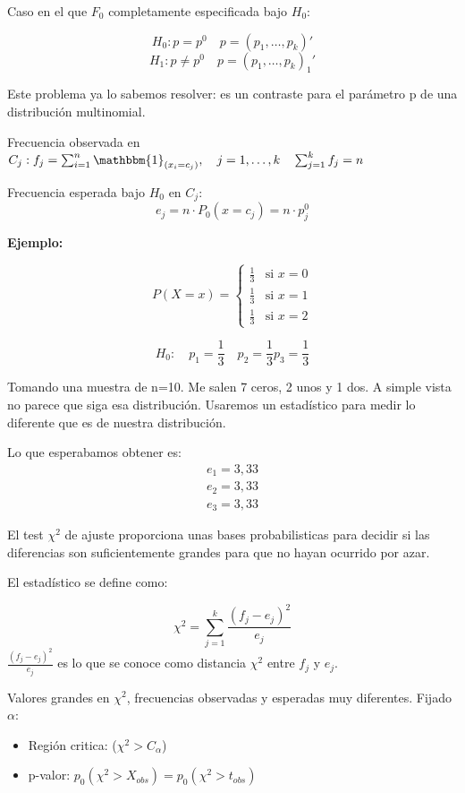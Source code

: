 Caso en el que $F_0$ completamente especificada bajo $H_0$:

\[
H_0: p=p^0 \quad p=(p_1,\dots,p_k)'
\]
\[
H_1: p \neq p^0 \quad p=(p_1,\dots,p_k)_1'
\]

Este problema ya lo sabemos resolver: es un contraste para el parámetro p de una distribución multinomial.

Frecuencia observada en $C_j: f_j=\sum_{i=1}^{n} \mathbbm{1}_{(x_i=c_j)}, \quad j=1,\dots,k \quad \sum_{j=1}^{k} f_j=n$

Frecuencia esperada bajo $H_0$ en $C_j$:
\[
e_j=n \cdot P_0(x=c_j)=n \cdot p_j^0
\]

\textbf{Ejemplo:}

\[
P(X = x) = 
\left\{
    \begin{matrix}
        \frac{1}{3} & \text{si } x = 0 \\[0.5em]
        \frac{1}{3} & \text{si } x = 1 \\[0.5em]
        \frac{1}{3} & \text{si } x = 2
    \end{matrix}
\right.
\]


\[
H_0:\quad p_1=\frac{1}{3} \quad p_2=\frac{1}{3} p_3=\frac{1}{3}
\]

Tomando una muestra de n=10. Me salen 7 ceros, 2 unos y 1 dos.
A simple vista no parece que siga esa distribución. Usaremos un estadístico para medir lo diferente que es de nuestra distribución.

Lo que esperabamos obtener es:
\[
\begin{matrix}
    e_1=3,33\\
    e_2=3,33\\
    e_3=3,33
\end{matrix}
\]

El test $\chi^2$ de ajuste proporciona unas bases probabilisticas para decidir si las diferencias son suficientemente grandes para que no hayan ocurrido por azar.

El estadístico se define como:

\[
\chi^2=\sum_{j=1}^{k} \frac{(f_j-e_j)^2}{e_j}
\]
 $\frac{(f_j-e_j)^2}{e_j}$ es lo que se conoce como distancia $\chi^2$ entre $f_j$ y $e_j$.

 Valores grandes en $\chi^2$, frecuencias observadas y esperadas muy diferentes. 
 Fijado $\alpha$:
 \begin{itemize}
    \item  Región critica: ($\chi^2 > C_\alpha$)
    \item  p-valor: $p_0(\chi^2>X_{obs})=p_0(\chi^2>t_{obs})$
 \end{itemize}

